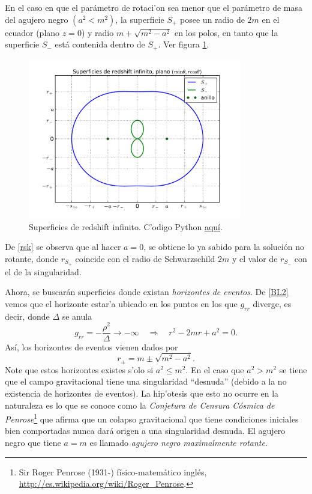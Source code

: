 En el caso en que el par\'ametro de rotaci'on sea menor que el par\'ametro de masa del agujero negro $(a^2<m^2)$, la superficie $S_{+}$ posee un radio de $2m$ en el ecuador (plano $z=0$) y radio $m+\sqrt{m^2-a^2}$ en los polos, en tanto que la superficie $S_{-}$ est\'a contenida dentro de $S_{+}$. Ver figura \ref{fig:surface1}.
\begin{figure}[H]
 \centering
\includegraphics[height=7cm,angle=0]{fig/fig-superficies-1.pdf}
\caption{Superficies de redshift infinito. C'odigo Python \href{https://github.com/gfrubi/GR/blob/master/figuras-editables/fig-superficies-Kerr-01.py}{aqu\'i}.}
\label{fig:surface1}
\end{figure}
De \eqref{rsk} se observa que al hacer $a=0$, se obtiene lo ya sabido para la soluci\'on no rotante, donde $r_{S_{+}}$ coincide con el radio de
Schwarzschild $2m$ y el valor de $r_{S_{-}}$ con el de la singularidad.

Ahora, se buscar\'an superficies donde existan \textit{horizontes de eventos}. De \eqref{BL2} vemos que el horizonte estar'a ubicado en los puntos en los que $g_{rr}$ diverge, es decir, donde $\Delta$ se anula
\begin{equation}\label{grr}
g_{rr}=-\frac{\rho^2}{\Delta}\rightarrow -\infty \quad\Rightarrow\quad r^2-2mr+a^2=0.
\end{equation}
As\'i, los horizontes de eventos vienen dados por
\begin{equation}\label{horizontes}
\boxed{r_{\pm}=m\pm\sqrt{m^2-a^2}.}
\end{equation}
Note que estos horizontes existes s'olo si $a^2\leqslant m^2$. En el caso que $a^2>m^2$ se tiene que el campo gravitacional tiene una singularidad ``desnuda'' (debido a la no existencia de horizontes de eventos). La hip'otesis que esto no ocurre en la naturaleza es lo que se conoce como la \textit{Conjetura de Censura C\'osmica de Penrose}\footnote{Sir Roger Penrose (1931-) f\'isico-matem\'atico ingl\'es, \url{http://es.wikipedia.org/wiki/Roger_Penrose}.} que afirma que un colapso gravitacional que tiene condiciones iniciales bien comportadas nunca dar\'a origen a una singularidad desnuda. El agujero negro que tiene $a=m$ es llamado \textit{agujero negro maximalmente rotante}.\\

